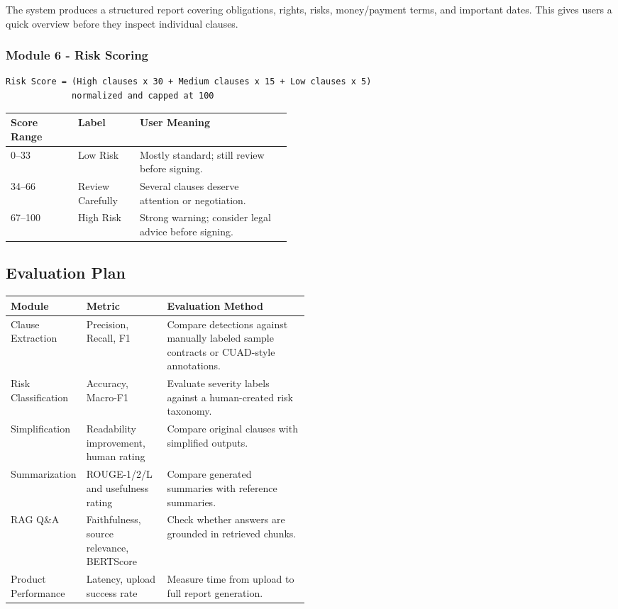 \documentclass[11pt,a4paper]{article}
\begin{document}
The system produces a structured report covering obligations, rights, risks, money/payment terms, and important dates. This gives users a quick overview before they inspect individual clauses.

\subsubsection{Module 6 - Risk Scoring}

\begin{verbatim}
Risk Score = (High clauses x 30 + Medium clauses x 15 + Low clauses x 5)
             normalized and capped at 100
\end{verbatim}

\begin{tabularx}{\linewidth}{L{0.24\linewidth} L{0.22\linewidth} Y}
\toprule
\textbf{Score Range} & \textbf{Label} & \textbf{User Meaning} \\
--33 & Low Risk & Mostly standard; still review before signing. \\
34--66 & Review Carefully & Several clauses deserve attention or negotiation. \\
67--100 & High Risk & Strong warning; consider legal advice before signing. \\
\bottomrule
\end{tabularx}

\subsection{Evaluation Plan}

\begin{tabularx}{\linewidth}{L{0.22\linewidth} L{0.27\linewidth} Y}
\toprule
\textbf{Module} & \textbf{Metric} & \textbf{Evaluation Method} \\
\midrule
Clause Extraction & Precision, Recall, F1 & Compare detections against manually labeled sample contracts or CUAD-style annotations. \\
Risk Classification & Accuracy, Macro-F1 & Evaluate severity labels against a human-created risk taxonomy. \\
Simplification & Readability improvement, human rating & Compare original clauses with simplified outputs. \\
Summarization & ROUGE-1/2/L and usefulness rating & Compare generated summaries with reference summaries. \\
RAG Q\&A & Faithfulness, source relevance, BERTScore & Check whether answers are grounded in retrieved chunks. \\
Product Performance & Latency, upload success rate & Measure time from upload to full report generation. \\
\bottomrule
\end{tabularx}
\end{document}
